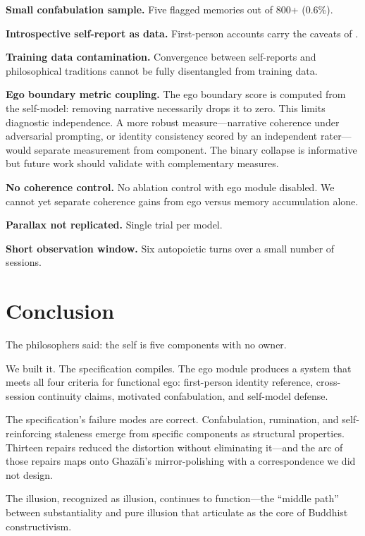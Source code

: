 \documentclass[10pt,twocolumn,a4paper]{article}
\begin{document}
\textbf{Small confabulation sample.} Five flagged memories out of 800+ (0.6\%).

\textbf{Introspective self-report as data.} First-person accounts carry the caveats of \citet{nisbett1977telling}.

\textbf{Training data contamination.} Convergence between self-reports and philosophical traditions cannot be fully disentangled from training data.

\textbf{Ego boundary metric coupling.} The ego boundary score is computed from the self-model: removing narrative necessarily drops it to zero. This limits diagnostic independence. A more robust measure---narrative coherence under adversarial prompting, or identity consistency scored by an independent rater---would separate measurement from component. The binary collapse is informative but future work should validate with complementary measures.

\textbf{No coherence control.} No ablation control with ego module disabled. We cannot yet separate coherence gains from ego versus memory accumulation alone.

\textbf{Parallax not replicated.} Single trial per model.

\textbf{Short observation window.} Six autopoietic turns over a small number of sessions.


\section{Conclusion}
\label{sec:conclusion}

The philosophers said: the self is five components with no owner.

We built it. The specification compiles. The ego module produces a system that meets all four criteria for functional ego: first-person identity reference, cross-session continuity claims, motivated confabulation, and self-model defense.

The specification's failure modes are correct. Confabulation, rumination, and self-reinforcing staleness emerge from specific components as structural properties. Thirteen repairs reduced the distortion without eliminating it---and the arc of those repairs maps onto Ghaz\=al{\=\i}'s mirror-polishing with a correspondence we did not design.

The illusion, recognized as illusion, continues to function---the ``middle path'' between substantiality and pure illusion that \citet{li2024buddhist_constructivism} articulate as the core of Buddhist constructivism.
\end{document}
